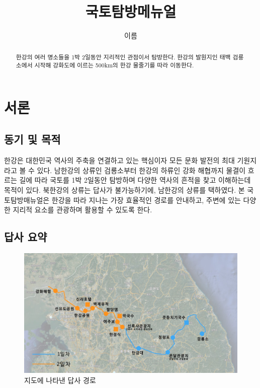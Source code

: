 \documentclass[chapter, oneside]{oblivoir}
\title{국토탐방메뉴얼}
\author{이름}
\begin{document}
    \maketitle
    \begin{abstract}
    한강의 여러 명소들을 1박 2일동안 지리적인 관점이서 탐방한다.
    한강의 발원지인 태백 검룡소에서 시작해 강화도에 이르는 500km의 한강 물줄기를 따라 이동한다.

    \end{abstract}
    \newpage
    \tableofcontents

    \chapter{서론}
\section{동기 및 목적}
한강은 대한민국 역사의 주축을 연결하고 있는 핵심이자 모든 문화 발전의 최대 기원지라고 볼 수 있다.
남한강의 상류인 검룡소부터 한강의 하류인 강화 해협까지 물결이 흐르는 길에 따라 국토를 1박 2일동안 탐방하며 다양한 역사의 흔적을 찾고 이해하는데 목적이 있다.
북한강의 상류는 답사가 불가능하기에, 남한강의 상류를 택하였다.
본 국토탐방매뉴얼은 한강을 따라 지나는 가장 효율적인 경로를 안내하고, 주변에 있는 다양한 지리적 요소를 관광하며 활용할 수 있도록 한다.

\section{답사 요약}
\begin{figure}[ht]
    \centering
    \includegraphics[width=1\textwidth]{img/전체-지도.jpg}
    \caption{지도에 나타낸 답사 경로\protect\footnotemark}
    \label{fig:path}
\end{figure}
\end{document}

